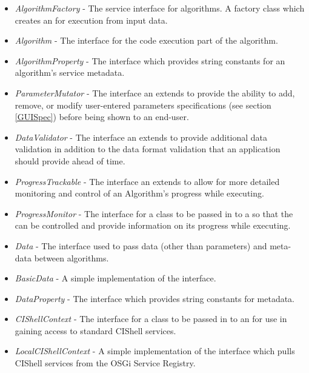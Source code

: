 \begin{itemize}
  \item \textit{AlgorithmFactory} - The service interface for algorithms.
  A factory class which creates an  for execution from input
  data.
  \item \textit{Algorithm} - The interface for the code execution part of the
  algorithm.
  \item \textit{AlgorithmProperty} - The interface which provides string
  constants for an algorithm's service metadata.
  \item \textit{ParameterMutator} - The interface an 
  extends to provide the ability to add, remove, or modify user-entered
  parameters specifications (see section \ref{GUISpec}) before being shown to an
  end-user.
  \item \textit{DataValidator} - The interface an 
  extends to provide additional data validation in addition to the data format validation
  that an application should provide ahead of time.
  \item \textit{ProgressTrackable} - The interface an  extends
  to allow for more detailed monitoring and control of an Algorithm's progress while
  executing.
  \item \textit{ProgressMonitor} - The interface for a class to be passed in to
  a   so that the 
  can be controlled and provide information on its progress while executing.
  \item \textit{Data} - The interface used to pass data (other than
  parameters) and meta-data between algorithms.
  \item \textit{BasicData} - A simple implementation of the 
  interface.
  \item \textit{DataProperty} - The interface which provides string constants
  for  metadata.
  \item \textit{CIShellContext} - The interface for a class to be passed in to
  an  for use in gaining access to standard CIShell
  services.
  \item \textit{LocalCIShellContext} - A simple implementation of the
   interface which pulls CIShell services from the OSGi
  Service Registry.
\end{itemize}

